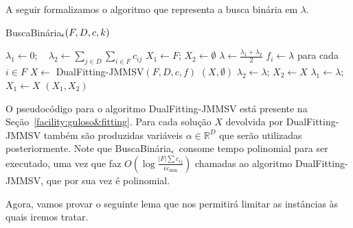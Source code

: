 A seguir formalizamos o algoritmo que representa a busca binária em $\lambda$.

\begin{algorithm}
    \caption{\sc BuscaBinária$_\epsilon(F,D,c,k)$}
    \begin{algorithmic}[1]
        \State $\lambda_1 \gets 0; \quad \lambda_2 \gets \sum_{j \in D}\sum_{i \in F}c_{ij} $
        \State $X_1 \gets F$; \quad $X_2 \gets \emptyset$
        \State $\lambda \gets \frac{\lambda_1 + \lambda_2}{2}$
        \State $f_i \gets \lambda$ para cada $i \in F$
        \State $X \gets$ {\sc DualFitting-JMMSV}$(F,D,c,f)$
        \State \Return $(X,\emptyset)$
        \State $\lambda_2 \gets \lambda$; \quad $X_2 \gets X$
        \Else
        \State $\lambda_1 \gets \lambda$;\quad$X_1 \gets X$
        \EndIf
        \EndWhile
        \State \Return $(X_1,X_2)$
    \end{algorithmic}
\end{algorithm}
O pseudocódigo para o algoritmo {\sc DualFitting-JMMSV} está presente na Seção~\ref{facility:guloso&fitting}. Para cada solução $X$ devolvida por {\sc DualFitting-JMMSV} também são produzidas variáveis $\alpha \in \mathbb{R}^D$ que serão utilizadas posteriormente. Note que {\sc BuscaBinária$_\epsilon$} consome tempo polinomial para ser executado, uma vez que faz $O(\log \frac{|F| \sum c_{ij}}{\epsilon c_{\min}})$ chamadas ao algoritmo {\sc DualFitting-JMMSV}, que por sua vez é polinomial.

Agora, vamos provar o seguinte lema que nos permitirá limitar as instâncias às quais iremos tratar.

